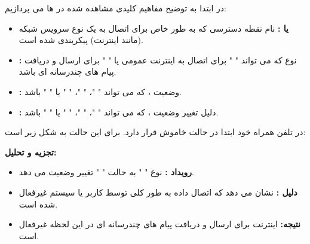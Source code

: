 \documentclass[landscape, 12pt]{report}
\begin{document}
در ابتدا به توضیح مفاهیم کلیدی مشاهده شده در 
ها می پردازیم:
\begin{itemize}
\item
\textbf{ 
یا
:}
نام نقطه دسترسی که به طور خاص برای اتصال به یک نوع سرویس شبکه (مانند اینترنت) پیکربندی شده است.
\item
\textbf{
:}
 نوع 
 که می تواند "
 " برای اتصال به اینترنت عمومی یا "
 " برای ارسال و دریافت پیام های چندرسانه ای باشد.
\item
\textbf{
:}
 وضعیت
  ، که می تواند "
  "، "
  "، "
  " یا "
  " باشد.
\item
\textbf{
: }
دلیل تغییر وضعیت 
، که می تواند "
"، "
"، "
" یا "
" باشد.

\end{itemize}
در تلفن همراه خود ابتدا 
در حالت خاموش قرار دارد. 
برای این حالت به شکل زیر است:
\begin{latin}
	
	\label{code:state1}
\end{latin}
\textbf{تجزیه و تحلیل:}
\begin{itemize}
	\item
	\textbf{رویداد
	: }
	 نوع "
	 " به حالت "
	 " تغییر وضعیت می دهد.
	\item
	\textbf{دلیل
	:}
	 نشان می دهد که اتصال داده به طور کلی توسط کاربر یا سیستم غیرفعال شده است.
	 \item
	\textbf{نتیجه:}
	 اینترنت برای ارسال و دریافت پیام های چندرسانه ای در این لحظه غیرفعال است.
\end{itemize}
\end{document}
